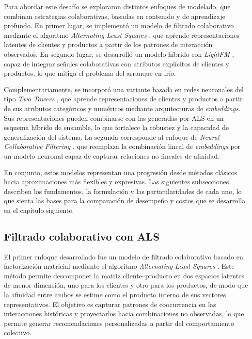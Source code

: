 Para abordar este desafío se exploraron distintos enfoques de modelado, que combinan estrategias colaborativas, basadas en contenido y de aprendizaje profundo. En primer lugar, se implementó un modelo de filtrado colaborativo mediante el algoritmo \textit{Alternating Least Squares} \cite{ARTICLE:ALS2008, ARTICLE:Hu2008}, que aprende representaciones latentes de clientes y productos a partir de los patrones de interacción observados. En segundo lugar, se desarrolló un modelo híbrido con \textit{LightFM} \cite{ARTICLE:LightFM2015}, capaz de integrar señales colaborativas con atributos explícitos de clientes y productos, lo que mitiga el problema del arranque en frío.

Complementariamente, se incorporó una variante basada en redes neuronales del tipo \textit{Two Towers} \cite{ARTICLE:Yi2019}, que aprende representaciones de clientes y productos a partir de sus atributos categóricos y numéricos mediante arquitecturas de \textit{embeddings}. Sus representaciones pueden combinarse con las generadas por ALS en un esquema híbrido de ensamble, lo que fortalece la robustez y la capacidad de generalización del sistema. La segunda corresponde al enfoque de \textit{Neural Collaborative Filtering} \cite{ARTICLE:He2017}, que reemplaza la combinación lineal de \textit{embeddings} por un modelo neuronal capaz de capturar relaciones no lineales de afinidad.

En conjunto, estos modelos representan una progresión desde métodos clásicos hacia aproximaciones más flexibles y expresivas. Las siguientes subsecciones describen los fundamentos, la formulación y las particularidades de cada uno, lo que sienta las bases para la comparación de desempeño y costos que se desarrolla en el capítulo siguiente.

\subsection{Filtrado colaborativo con ALS}

El primer enfoque desarrollado fue un modelo de filtrado colaborativo basado en factorización matricial mediante el algoritmo \textit{Alternating Least Squares} \cite{ARTICLE:Koren2009}. Este método permite descomponer la matriz cliente–producto en dos espacios latentes de menor dimensión, uno para los clientes y otro para los productos, de modo que la afinidad entre ambos se estime como el producto interno de sus vectores representativos. El objetivo es capturar patrones de coocurrencia en las interacciones históricas y proyectarlos hacia combinaciones no observadas, lo que permite generar recomendaciones personalizadas a partir del comportamiento colectivo.


